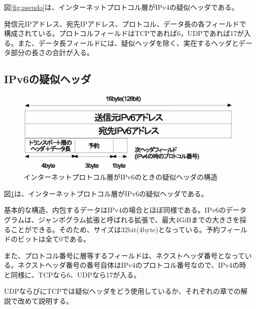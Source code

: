 図\ref{fig:pseudo}は、インターネットプロトコル層がIPv4の疑似ヘッダである。

発信元IPアドレス、宛先IPアドレス、プロトコル、データ長の各フィールドで構成されている。プロトコルフィールドはTCPであれば6，UDPであれば17が入る。また、データ長フィールドには、疑似ヘッダを除く、実在するヘッダとデータ部分の長さの合計が入る。

\subsection{IPv6の疑似ヘッダ}

\begin{figure}[htbp]
	\includegraphics[width=12cm,clip]{draw/pseudoheader6.eps}
	\caption{インターネットプロトコル層がIPv6のときの疑似ヘッダの構造}
	\label{fig:pseudo6}
\end{figure}

図\ref{fig:pseudo6}は、インターネットプロトコル層がIPv6の疑似ヘッダである。

基本的な構造、内包するデータはIPv4の場合とほぼ同様である。IPv6のデータグラムは、ジャンボグラム拡張と呼ばれる拡張で、最大4GiBまでの大きさを採ることができる。そのため、サイズは32bit(4byte)となっている。予約フィールドのビットは全て0である。

また、プロトコル番号に層等するフィールドは、ネクストヘッダ番号となっている。ネクストヘッダ番号の番号自体はIPv4のプロトコル番号なので、IPv4の時と同様に、TCPなら6、UDPなら17が入る。

UDPならびにTCPでは疑似ヘッダをどう使用しているか、それぞれの章での解説で改めて説明する。

